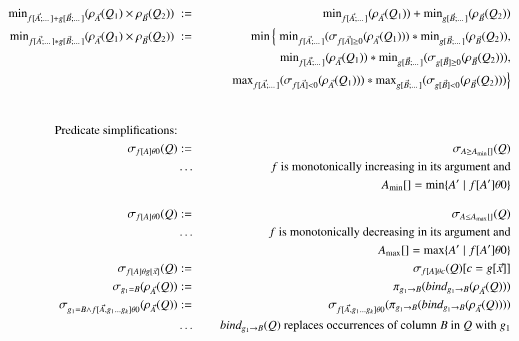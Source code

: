 \documentclass{article}
\begin{document}
\begin{figure*}
\begin{eqnarray}
\\
\label{eq:min6}
\algmin_{f[\vec{A};\dots] + g[\vec{B};\dots]}(\rho_{\vec{A}}(Q_1) \times \rho_{\vec{B}}(Q_2)) \; &:=&
\algmin_{f[\vec{A};\dots]}(\rho_{\vec{A}}(Q_1))
    + \algmin_{g[\vec{B};\dots]}(\rho_{\vec{B}}(Q_2))
\\
\label{eq:min7}
\algmin_{f[\vec{A};\dots] * g[\vec{B};\dots]}(\rho_{\vec{A}}(Q_1) \times \rho_{\vec{B}}(Q_2)) \; &:=&
\min \Big\{\;
\algmin_{f[\vec{A};\dots]} (\sigma_{f[\vec{A}] \geq 0} (\rho_{\vec{A}}(Q_1)))
    * \algmin_{g[\vec{B};\dots]} (\rho_{\vec{B}}(Q_2)), \nonumber\\
&& \qquad \;
\algmin_{f[\vec{A};\dots]} (\rho_{\vec{A}} (Q_1))
    * \algmin_{g[\vec{B};\dots]} (\sigma_{g[\vec{B}] \geq 0} (\rho_{\vec{B}}(Q_2))), \nonumber\\
&& \qquad \;
\algmax_{f[\vec{A};\dots]} (\sigma_{f[\vec{A}] < 0} (\rho_{\vec{A}} (Q_1)))
    * \algmax_{g[\vec{B};\dots]} (\sigma_{g[\vec{B}] < 0} (\rho_{\vec{B}}(Q_2)))
\Big\}
\\ \nonumber
%
%
%
\\[2ex]
\mbox{Predicate simplifications:} && \nonumber\\
\label{eq:pred1}
\sigma_{f[A] \theta 0}(Q) &:=& \sigma_{A \ge A_{\min}[]}(Q)
\\
&\dots& \mbox{$f$ is monotonically increasing in its argument and}
\nonumber
\\
&& A_{\min}[] = \min \{ A' \mid f[A'] \theta 0 \} 
\nonumber
\\[2ex]
\label{eq:pred2}
\sigma_{f[A] \theta 0}(Q) &:=& \sigma_{A \le A_{\max}[]}(Q)
\\
&\dots& \mbox{$f$ is monotonically decreasing in its argument and}
\nonumber
\\
&& A_{\max}[] = \max \{ A' \mid f[A'] \theta 0 \} 
\nonumber
\\
\label{eq:pred3}
\sigma_{f[A] \theta g[\vec{x}]}(Q) &:=& \sigma_{f[A] \theta c}(Q)[c=g[\vec{x}]]
\\
\label{eq:pred4}
\sigma_{g_1=B} (\rho_{\vec{A}}(Q)) &:=&
\pi_{g_1\rightarrow B}(bind_{g_1\rightarrow B}(\rho_{\vec{A}}(Q)))
\\
\label{eq:pred5}
\sigma_{g_1=B \wedge f[\vec{A}, g_1 \dots g_k] \theta 0}(\rho_{\vec{A}}(Q)) &:=&
\sigma_{f[\vec{A}, g_1 \dots g_k] \theta 0}(\pi_{g_1 \rightarrow B}(
bind_{g_1 \rightarrow B}(\rho_{\vec{A}}(Q))))
\\
\nonumber &\dots& \mbox{$bind_{g_1 \rightarrow B}(Q)$ replaces occurrences of column $B$ in $Q$ with $g_1$}
%
%
\\[2ex]

\end{eqnarray}
\end{figure*}
\end{document}
